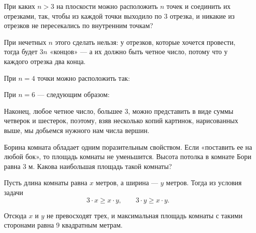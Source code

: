 
\begin{itemize}

	\itB При каких $n>3$ на плоскости можно расположить $n$ точек и соединить их отрезками, так, чтобы из каждой точки выходило по 3 отрезка, и никакие из отрезков не пересекались по внутренним точкам?
	
	\itr При нечетных $n$ этого сделать нельзя: у отрезков, которые хочется провести, тогда будет $3n$ «концов» — а их должно быть четное число, потому что у каждого отрезка два конца.
	
	При $n=4$ точки можно расположить так:
	
	\begin{center}  \end{center}
	
	При $n=6$ — следующим образом:
	
	\begin{center}  \end{center}
	
	Наконец, любое четное число, большее 3, можно представить в виде суммы четверок и шестерок, поэтому, взяв несколько копий картинок, нарисованных выше, мы добьемся нужного нам числа вершин.

\end{itemize}


\begin{itemize}

	\itA Борина комната обладает одним поразительным свойством. Если «поставить ее на любой бок», то площадь комнаты не уменьшится. Высота потолка в комнате Бори равна 3 м. Какова наибольшая площадь такой комнаты?
	
	\itr Пусть длина комнаты равна $x$ метров, а ширина — $y$ метров. Тогда из условия задачи
	$$3\cdot x \ge x \cdot y,\qquad 3 \cdot y \ge x \cdot y.$$
	
	Отсюда $x$ и $y$ не превосходят трех, и максимальная площадь комнаты с такими сторонами равна 9 квадратным метрам.

\end{itemize}

